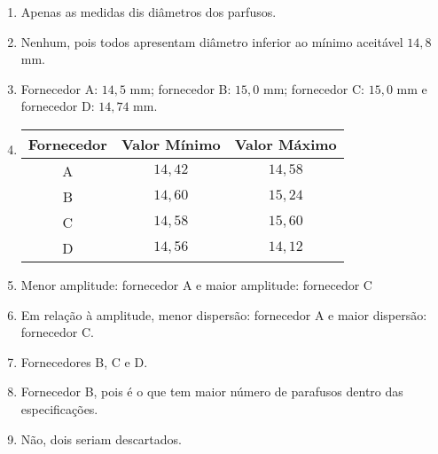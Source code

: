 \documentclass[10 pt,usenames,dvipsnames, oneside]{article}
\begin{document}
\ifdefined\prof
\begin{solucao}
\begin{enumerate}

\item Apenas as medidas dis diâmetros dos parfusos.

\item Nenhum, pois todos apresentam diâmetro inferior ao mínimo aceitável $14{,}8$ mm.

\item Fornecedor A: $14{,}5$ mm; fornecedor B: $15{,}0$ mm; fornecedor C: $15{,}0$ mm e fornecedor D: $14{,}74$ mm.

\clearpage

\item {}
{
	\begin{tabu} to \textwidth{|c|c|c|}
	\hline
	\thead
	Fornecedor & Valor Mínimo & Valor Máximo \\
	\hline
	A & $14{,}42$ & $14{,}58$ \\
	\hline
	B & $14{,}60$ & $15{,}24$ \\
	\hline
	C & $14{,}58$ & $15{,}60$ \\
	\hline
	D & $14{,}56$ & $14{,}12$ \\
	\hline
	\end{tabu}
}

\item Menor amplitude: fornecedor A e maior amplitude: fornecedor C

\item Em relação à amplitude, menor dispersão: fornecedor A e maior dispersão: fornecedor C.

\item Fornecedores B, C e D.

\item Fornecedor B, pois é o que tem maior número de parafusos dentro das especificações.

\item Não, dois seriam descartados.
\end{enumerate}
\end{solucao}
\fi
\end{document}
